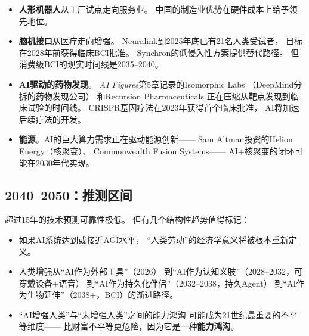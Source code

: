 \begin{itemize}
  \item \textbf{人形机器人}从工厂试点走向服务业。
    中国的制造业优势在硬件成本上给予领先地位。
  \item \textbf{脑机接口}从医疗走向增强。
    Neuralink到2025年底已有21名人类受试者，
    目标在2028年前获得临床BCI批准。
    Synchron的低侵入性方案提供替代路径。
    但消费级BCI的现实时间线是2035--2040。
  \item \textbf{AI驱动的药物发现}。
    \textit{AI Figures}第5章记录的Isomorphic Labs
    （DeepMind分拆的药物发现公司）
    和Recursion Pharmaceuticals
    正在压缩从靶点发现到临床试验的时间线。
    CRISPR基因疗法在2023年获得首个临床批准，
    AI将加速后续疗法的开发。
  \item \textbf{能源}。AI的巨大算力需求正在驱动能源创新——
    Sam Altman投资的Helion Energy（核聚变）、
    Commonwealth Fusion Systems——
    AI+核聚变的闭环可能在2030年代实现。
\end{itemize}

\subsection{2040--2050：推测区间}

超过15年的技术预测可靠性极低。
但有几个结构性趋势值得标记：

\begin{itemize}
  \item 如果AI系统达到或接近AGI水平，
    ``人类劳动''的经济学意义将被根本重新定义。
  \item 人类增强从``AI作为外部工具''（2026）
    到``AI作为认知义肢''（2028--2032，可穿戴设备+语音）
    到``AI作为持久化伴侣''（2032--2038，持久Agent）
    到``AI作为生物延伸''（2038+，BCI）的渐进路径。
  \item ``AI增强人类''与``未增强人类''之间的能力鸿沟
    可能成为21世纪最重要的不平等维度——
    比财富不平等更危险，因为它是一种\textbf{能力鸿沟}。
\end{itemize}

